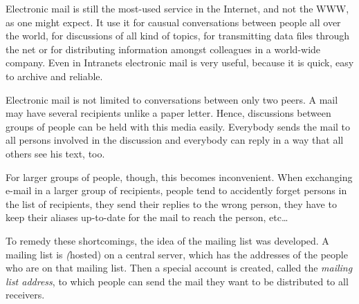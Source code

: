 \documentclass[a4paper,10pt]{scrreprt}
\newcommand{\Def}[1]{{\sl #1}}
\begin{document}
\bigskip

Electronic mail is still the most-used service in the Internet, and
not the WWW, as one might expect. It use it for causual conversations
between people all over the world, for discussions of all kind of
topics, for transmitting data files through the net or for
distributing information amongst colleagues in a world-wide company.
Even in Intranets electronic mail is very useful, because it is quick,
easy to archive and reliable.

Electronic mail is not limited to conversations between only two
peers. A mail may have several recipients unlike a paper letter.
Hence, discussions between groups of people can be held with this
media easily. Everybody sends the mail to all persons involved in the
discussion and everybody can reply in a way that all others see his
text, too.

For larger groups of people, though, this becomes inconvenient. When
exchanging e-mail in a larger group of recipients, people tend to
accidently forget persons in the list of recipients, they send their
replies to the wrong person, they have to keep their aliases
up-to-date for the mail to reach the person, etc\dots{}

To remedy these shortcomings, the idea of the mailing list was
developed. A mailing list is \Def(hosted) on a central server, which has the addresses of the people who
are on that mailing list. Then a special account is created, called
the \Def{mailing list address}, to which people can send the mail they
want to be distributed to all receivers.
\end{document}
